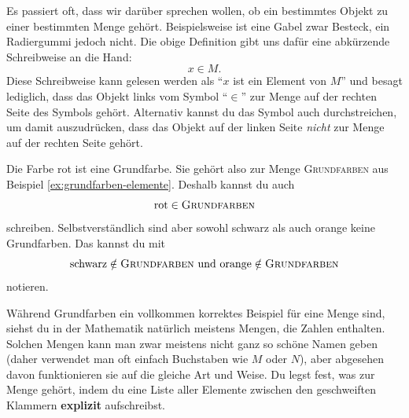 \documentclass[../../main.tex]{subfiles}
\begin{document}
Es passiert oft, dass wir darüber sprechen wollen, ob ein bestimmtes Objekt zu einer bestimmten Menge gehört. Beispielsweise ist eine Gabel zwar Besteck, ein Radiergummi jedoch nicht. Die obige Definition gibt uns dafür eine abkürzende Schreibweise an die Hand:
\[x\in M.\]
Diese Schreibweise kann gelesen werden als \enquote{$x$ ist ein Element von $M$} und besagt lediglich, dass das Objekt links vom Symbol \enquote{$\in$} zur Menge auf der rechten Seite des Symbols gehört. Alternativ kannst du das Symbol auch durchstreichen, um damit auszudrücken, dass das Objekt auf der linken Seite \emph{nicht} zur Menge auf der rechten Seite gehört.

\begin{example}{}
    Die Farbe rot ist eine Grundfarbe. Sie gehört also zur Menge \textsc{Grundfarben} aus Beispiel \ref{ex:grundfarben-elemente}. Deshalb kannst du auch
    \[\text{rot}\in\textsc{Grundfarben}\]
    schreiben. Selbstverständlich sind aber sowohl schwarz als auch orange keine Grundfarben. Das kannst du mit
    \[\text{schwarz}\notin\textsc{Grundfarben}~\text{und}~\text{orange}\notin\textsc{Grundfarben}\]
    notieren.
\end{example}

Während Grundfarben ein vollkommen korrektes Beispiel für eine Menge sind, siehst du in der Mathematik natürlich meistens Mengen, die Zahlen enthalten. Solchen Mengen kann man zwar meistens nicht ganz so schöne Namen geben (daher verwendet man oft einfach Buchstaben wie $M$ oder $N$), aber abgesehen davon funktionieren sie auf die gleiche Art und Weise. Du legst fest, was zur Menge gehört, indem du eine Liste aller Elemente zwischen den geschweiften Klammern \textbf{explizit} aufschreibst.
\end{document}

